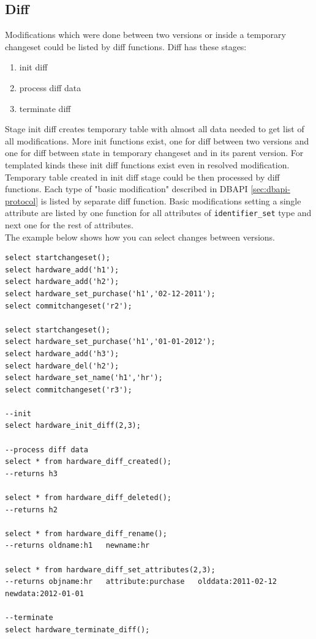 \documentclass[deska]{subfiles}
\begin{document}
\subsection{Diff}
Modifications which were done between two versions or inside a temporary changeset could be listed by diff functions. Diff has these stages:
\begin{enumerate}
    \item init diff
    \item process diff data
    \item terminate diff
\end{enumerate}
Stage init diff creates temporary table with almost all data needed to get list of all modifications.
More init functions exist, one for diff between two versions and one for diff between state in temporary changeset and in its parent version. For templated kinds these init diff functions exist even in resolved modification.\\
Temporary table created in init diff stage could be then processed by diff functions. Each type of "basic modification" described in DBAPI \ref{sec:dbapi-protocol} is listed by separate diff function. Basic modifications setting a single attribute are listed by one function for all attributes of {\tt identifier\_set} type and next one for the rest of attributes.\\
The example below shows how you can select changes between versions.

\begin{verbatim}
select startchangeset();
select hardware_add('h1');
select hardware_add('h2');
select hardware_set_purchase('h1','02-12-2011');
select commitchangeset('r2');

select startchangeset();
select hardware_set_purchase('h1','01-01-2012');
select hardware_add('h3');
select hardware_del('h2');
select hardware_set_name('h1','hr');
select commitchangeset('r3');

--init
select hardware_init_diff(2,3);

--process diff data
select * from hardware_diff_created();
--returns h3

select * from hardware_diff_deleted();
--returns h2

select * from hardware_diff_rename();
--returns oldname:h1   newname:hr

select * from hardware_diff_set_attributes(2,3);
--returns objname:hr   attribute:purchase   olddata:2011-02-12   newdata:2012-01-01

--terminate
select hardware_terminate_diff();
\end{verbatim}
\end{document}
